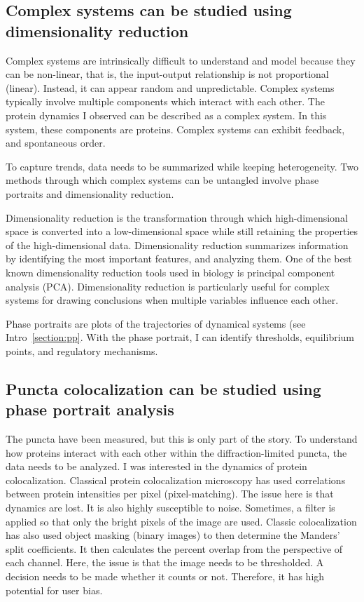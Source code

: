 \subsection{Complex systems can be studied using dimensionality reduction}
\label{section:complex}
Complex systems are intrinsically difficult to understand and model because they can be non-linear, that is, the input-output relationship is not proportional (linear). Instead, it can appear random and unpredictable. Complex systems typically involve multiple components which interact with each other. The protein dynamics I observed can be described as a complex system. In this system, these components are proteins. Complex systems can exhibit feedback, and spontaneous order.

To capture trends, data needs to be summarized while keeping heterogeneity. Two methods through which complex systems can be untangled involve phase portraits and dimensionality reduction.

Dimensionality reduction is the transformation through which high-dimensional space is converted into a low-dimensional space while still retaining the properties of the high-dimensional data. Dimensionality reduction summarizes information by identifying the most important features, and analyzing them. One of the best known dimensionality reduction tools used in biology is principal component analysis (PCA). Dimensionality reduction is particularly useful for complex systems for drawing conclusions when multiple variables influence each other.

Phase portraits are plots of the trajectories of dynamical systems (see Intro~\ref{section:pp}. With the phase portrait, I can identify thresholds, equilibrium points, and regulatory mechanisms.

\subsection{Puncta colocalization can be studied using phase portrait analysis}
\label{section:pp_method}
The puncta have been measured, but this is only part of the story. To understand how proteins interact with each other within the diffraction-limited puncta, the data needs to be analyzed. I was interested in the dynamics of protein colocalization. Classical protein colocalization microscopy has used correlations between protein intensities per pixel (pixel-matching). The issue here is that dynamics are lost. It is also highly susceptible to noise. Sometimes, a filter is applied so that only the bright pixels of the image are used. Classic colocalization has also used object masking (binary images) to then determine the Manders’ split coefficients. It then calculates the percent overlap from the perspective of each channel. Here, the issue is that the image needs to be thresholded. A decision needs to be made whether it counts or not. Therefore, it has high potential for user bias.

